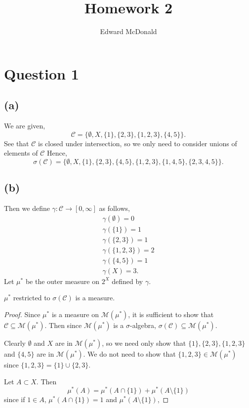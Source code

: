 \documentclass{unswmaths}
\begin{document}
\subject{Measure Theory}
\author{Edward McDonald}
\title{Homework 2}


\setlength\parindent{0pt}


\newcommand{\Bor}{\mathcal{B}(\Rl)}


\unswtitle{}


\section*{Question 1}
\subsection*{(a)}
    We are given,
    \begin{equation*}
        \mathcal{C} = \{\emptyset, X, \{1\},\{2,3\},\{1,2,3\},\{4,5\}\}.
    \end{equation*}
    See that $\mathcal{C}$ is closed under intersection, so we only
    need to consider unions of elements of $\mathcal{C}$
    Hence, 
    \begin{equation*}
        \sigma(\mathcal{C}) = \{\emptyset, X, \{1\},\{2,3\},\{4,5\},\{1,2,3\},\{1,4,5\},\{2,3,4,5\}\}.
    \end{equation*}
    
    
\subsection*{(b)}
Then we define $\gamma:\mathcal{C}\rightarrow[0,\infty]$ as follows,
\begin{align*}
    \gamma(\emptyset) = 0\\
    \gamma(\{1\}) = 1\\
    \gamma(\{2,3\}) = 1\\
    \gamma(\{1,2,3\}) = 2\\
    \gamma(\{4,5\}) = 1\\
    \gamma(X) = 3.
\end{align*}
Let $\mu^*$ be the outer measure on $2^X$ defined by $\gamma$.
\begin{lemma}
    $\mu^*$ restricted to $\sigma(\mathcal{C})$ is a measure.
\end{lemma}
\begin{proof}
    Since $\mu^*$ is a measure on $\mathcal{M}(\mu^*)$, it is sufficient to show
    that $\mathcal{C} \subseteq \mathcal{M}(\mu^*)$. Then since $\mathcal{M}(\mu^*)$ is
    a $\sigma$-algebra, $\sigma(\mathcal{C}) \subseteq \mathcal{M}(\mu^*)$.
    
    Clearly $\emptyset$ and $X$ are in $\mathcal{M}(\mu^*)$, so 
    we need only show that $\{1\},\{2,3\},\{1,2,3\}$ and $\{4,5\}$
    are in $\mathcal{M}(\mu^*)$. We do not need to show that $\{1,2,3\} \in \mathcal{M}(\mu^*)$
    since $\{1,2,3\} = \{1\}\cup\{2,3\}$.
    
    Let $A \subset X$. Then
    \begin{equation*}
        \mu^*(A) = \mu^*(A\cap \{1\}) + \mu^*(A\setminus\{1\})
    \end{equation*}
    since if $1 \in A$, $\mu^*(A\cap\{1\}) = 1$ and $\mu^*(A\setminus\{1\})$,
    
\end{proof} 
\end{document}
